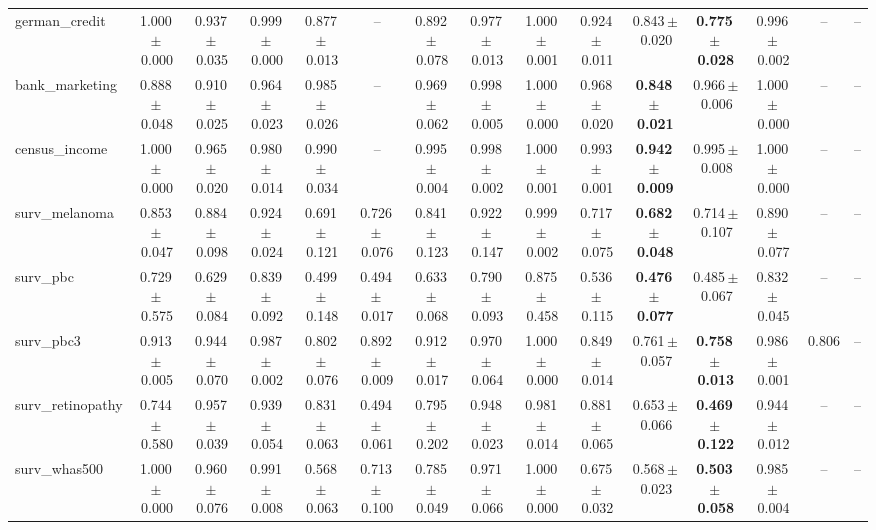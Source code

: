 \documentclass[8pt]{extarticle}
\begin{document}
\begin{longtable}{l*{14}{c}}
german\_credit & 1.000\,$\pm$\,0.000 & 0.937\,$\pm$\,0.035 & 0.999\,$\pm$\,0.000 & 0.877\,$\pm$\,0.013 & -- & 0.892\,$\pm$\,0.078 & 0.977\,$\pm$\,0.013 & 1.000\,$\pm$\,0.001 & 0.924\,$\pm$\,0.011 & 0.843\,$\pm$\,0.020 & \textbf{0.775\,$\pm$\,0.028} & 0.996\,$\pm$\,0.002 & -- & -- \\
bank\_marketing & 0.888\,$\pm$\,0.048 & 0.910\,$\pm$\,0.025 & 0.964\,$\pm$\,0.023 & 0.985\,$\pm$\,0.026 & -- & 0.969\,$\pm$\,0.062 & 0.998\,$\pm$\,0.005 & 1.000\,$\pm$\,0.000 & 0.968\,$\pm$\,0.020 & \textbf{0.848\,$\pm$\,0.021} & 0.966\,$\pm$\,0.006 & 1.000\,$\pm$\,0.000 & -- & -- \\
census\_income & 1.000\,$\pm$\,0.000 & 0.965\,$\pm$\,0.020 & 0.980\,$\pm$\,0.014 & 0.990\,$\pm$\,0.034 & -- & 0.995\,$\pm$\,0.004 & 0.998\,$\pm$\,0.002 & 1.000\,$\pm$\,0.001 & 0.993\,$\pm$\,0.001 & \textbf{0.942\,$\pm$\,0.009} & 0.995\,$\pm$\,0.008 & 1.000\,$\pm$\,0.000 & -- & -- \\
surv\_melanoma & 0.853\,$\pm$\,0.047 & 0.884\,$\pm$\,0.098 & 0.924\,$\pm$\,0.024 & 0.691\,$\pm$\,0.121 & 0.726\,$\pm$\,0.076 & 0.841\,$\pm$\,0.123 & 0.922\,$\pm$\,0.147 & 0.999\,$\pm$\,0.002 & 0.717\,$\pm$\,0.075 & \textbf{0.682\,$\pm$\,0.048} & 0.714\,$\pm$\,0.107 & 0.890\,$\pm$\,0.077 & -- & -- \\
surv\_pbc & 0.729\,$\pm$\,0.575 & 0.629\,$\pm$\,0.084 & 0.839\,$\pm$\,0.092 & 0.499\,$\pm$\,0.148 & 0.494\,$\pm$\,0.017 & 0.633\,$\pm$\,0.068 & 0.790\,$\pm$\,0.093 & 0.875\,$\pm$\,0.458 & 0.536\,$\pm$\,0.115 & \textbf{0.476\,$\pm$\,0.077} & 0.485\,$\pm$\,0.067 & 0.832\,$\pm$\,0.045 & -- & -- \\
surv\_pbc3 & 0.913\,$\pm$\,0.005 & 0.944\,$\pm$\,0.070 & 0.987\,$\pm$\,0.002 & 0.802\,$\pm$\,0.076 & 0.892\,$\pm$\,0.009 & 0.912\,$\pm$\,0.017 & 0.970\,$\pm$\,0.064 & 1.000\,$\pm$\,0.000 & 0.849\,$\pm$\,0.014 & 0.761\,$\pm$\,0.057 & \textbf{0.758\,$\pm$\,0.013} & 0.986\,$\pm$\,0.001 & 0.806 & -- \\
surv\_retinopathy & 0.744\,$\pm$\,0.580 & 0.957\,$\pm$\,0.039 & 0.939\,$\pm$\,0.054 & 0.831\,$\pm$\,0.063 & 0.494\,$\pm$\,0.061 & 0.795\,$\pm$\,0.202 & 0.948\,$\pm$\,0.023 & 0.981\,$\pm$\,0.014 & 0.881\,$\pm$\,0.065 & 0.653\,$\pm$\,0.066 & \textbf{0.469\,$\pm$\,0.122} & 0.944\,$\pm$\,0.012 & -- & -- \\
surv\_whas500 & 1.000\,$\pm$\,0.000 & 0.960\,$\pm$\,0.076 & 0.991\,$\pm$\,0.008 & 0.568\,$\pm$\,0.063 & 0.713\,$\pm$\,0.100 & 0.785\,$\pm$\,0.049 & 0.971\,$\pm$\,0.066 & 1.000\,$\pm$\,0.000 & 0.675\,$\pm$\,0.032 & 0.568\,$\pm$\,0.023 & \textbf{0.503\,$\pm$\,0.058} & 0.985\,$\pm$\,0.004 & -- & -- \\

\end{longtable}
\end{document}
